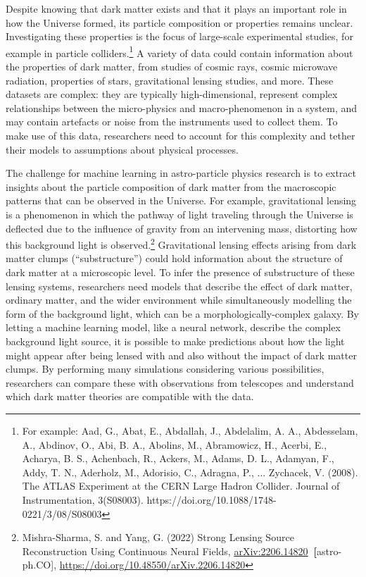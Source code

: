 {Despite knowing that dark matter exists and that it plays an important
role in how the Universe formed, its particle composition or properties
remains unclear. Investigating these properties is the focus of
large-scale experimental studies, for example in particle
colliders.\footnote{For example: Aad, G., Abat, E., Abdallah, J.,
  Abdelalim, A. A., Abdesselam, A., Abdinov, O., Abi, B. A., Abolins,
  M., Abramowicz, H., Acerbi, E., Acharya, B. S., Achenbach, R., Ackers,
  M., Adams, D. L., Adamyan, F., Addy, T. N., Aderholz, M., Adorisio,
  C., Adragna, P., ... Zychacek, V. (2008). The ATLAS Experiment at the
  CERN Large Hadron Collider. Journal of Instrumentation, 3(S08003).
  https://doi.org/10.1088/1748-0221/3/08/S08003} A variety of data could
contain information about the properties of dark matter, from studies of
cosmic rays, cosmic microwave radiation, properties of stars,
gravitational lensing studies, and more. These datasets are complex:
they are typically high-dimensional, represent complex relationships
between the micro-physics and macro-phenomenon in a system, and may
contain artefacts or noise from the instruments used to collect them. To
make use of this data, researchers need to account for this complexity
and tether their models to assumptions about physical processes.

The challenge for machine learning in astro-particle physics research is
to extract insights about the particle composition of dark matter from
the macroscopic patterns that can be observed in the Universe. For
example, gravitational lensing is a phenomenon in which the pathway of
light traveling through the Universe is deflected due to the influence
of gravity from an intervening mass, distorting how this background
light is observed.\footnote{Mishra-Sharma, S. and Yang, G. (2022) Strong
  Lensing Source Reconstruction Using Continuous Neural Fields,
  \href{https://arxiv.org/abs/2206.14820}{\uline{arXiv:2206.14820}}\textbf{~{[}}astro-ph.CO{]},
  \url{https://doi.org/10.48550/arXiv.2206.14820}} Gravitational lensing
effects arising from dark matter clumps (``substructure'') could hold
information about the structure of dark matter at a microscopic level.
To infer the presence of substructure of these lensing systems,
researchers need models that describe the effect of dark matter,
ordinary matter, and the wider environment while simultaneously
modelling the form of the background light, which can be a
morphologically-complex galaxy. By letting a machine learning model,
like a neural network, describe the complex background light source, it
is possible to make predictions about how the light might appear after
being lensed with and also without the impact of dark matter clumps. By
performing many simulations considering various possibilities,
researchers can compare these with observations from telescopes and
understand which dark matter theories are compatible with the data.

}
